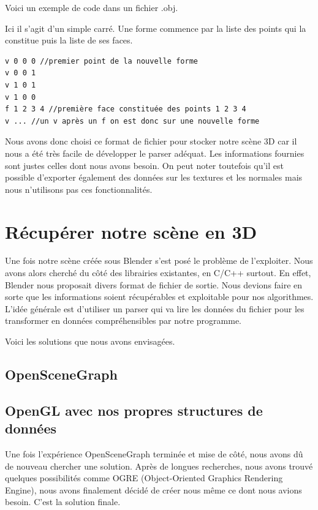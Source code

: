\documentclass[a4paper,12pt]{report}
\begin{document}
Voici un exemple de code dans un fichier .obj.

Ici il s'agit d'un simple carré. Une forme commence par la liste des points qui la constitue puis la liste de ses faces.

\begin{verbatim}
v 0 0 0 //premier point de la nouvelle forme
v 0 0 1
v 1 0 1
v 1 0 0
f 1 2 3 4 //première face constituée des points 1 2 3 4
v ... //un v après un f on est donc sur une nouvelle forme
\end{verbatim}

Nous avons donc choisi ce format de fichier pour stocker notre scène 3D car il nous a été très facile de développer le parser adéquat. Les informations fournies sont justes celles dont nous avons besoin. On peut noter toutefois qu'il est possible d'exporter également des données sur les textures et les normales mais nous n'utilisons pas ces fonctionnalités.

\section{Récupérer notre scène en 3D}
 
Une fois notre scène créée sous Blender s'est posé le problème de l'exploiter. Nous avons alors cherché du côté des librairies existantes, en C/C++ surtout. En effet, Blender nous proposait divers format de fichier de sortie. Nous devions faire en sorte que les informations soient récupérables et exploitable pour nos algorithmes. L'idée générale est d'utiliser un parser qui va lire les données du fichier pour les transformer en données compréhensibles par notre programme.

Voici les solutions que nous avons envisagées.
 
\subsection{OpenSceneGraph}

\subsection{OpenGL avec nos propres structures de données}

Une fois l'expérience OpenSceneGraph terminée et mise de côté, nous avons dû de nouveau chercher une solution. Après de longues recherches, nous avons trouvé quelques possibilités comme OGRE (Object-Oriented Graphics Rendering Engine), nous avons finalement décidé de créer nous même ce dont nous avions besoin. C'est la solution finale.
\end{document}
